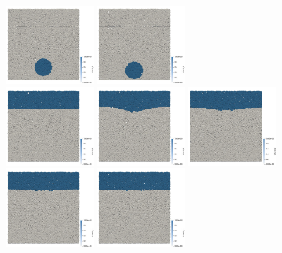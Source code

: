 \begin{center}
\includegraphics[width=3.3cm]{images/stokes_sphere_fs2D/harm_6_1/swarm_C1_0150}
\includegraphics[width=3.3cm]{images/stokes_sphere_fs2D/harm_6_1/swarm_C1_0200}\\
\includegraphics[width=3.3cm]{images/stokes_sphere_fs2D/harm_6_1/swarm_C2_0000}
\includegraphics[width=3.3cm]{images/stokes_sphere_fs2D/harm_6_1/swarm_C2_0050}
\includegraphics[width=3.3cm]{images/stokes_sphere_fs2D/harm_6_1/swarm_C2_0100}
\includegraphics[width=3.3cm]{images/stokes_sphere_fs2D/harm_6_1/swarm_C2_0150}
\includegraphics[width=3.3cm]{images/stokes_sphere_fs2D/harm_6_1/swarm_C2_0200}\\

\end{center}
